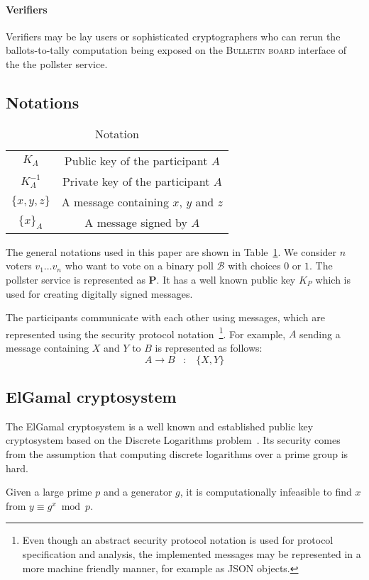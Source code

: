 \paragraph{Verifiers}
Verifiers may be lay users or sophisticated cryptographers who can
rerun the ballots-to-tally computation being exposed on the
\textsc{Bulletin board} interface of the the pollster service.


\subsection{Notations}

\begin{table}[t]
\caption{Notation}
\begin{center}
\begin{tabular}{|cc|} \hline
$K_A$   &  Public key of the participant $A$\\
$K^{-1}_A$   &  Private key of the participant $A$ \\
$\{x,y,z\}$   &  A message containing $x$, $y$ and $z$ \\
$\{x\}_A$ &  A message signed by $A$ \\ \hline
\end{tabular}
\label{table:notation}
\end{center}
\end{table}
  
The general notations used in this paper are shown in Table~\ref{table:notation}.
We consider $n$ voters $v_1\ldots v_n$  who want to vote on a
binary poll $\mathcal{B}$ with choices $0$ or $1$.
The pollster service is represented as $\mathbf{P}$.
It has a well known public key $K_P$ which
is used for creating digitally signed messages.

The participants communicate with each other using messages, which are
represented using the security protocol
notation~\footnote{ Even though an abstract
  security protocol notation is used for protocol
  specification and analysis, the implemented messages may be represented
  in a more machine friendly manner, for example as JSON objects.
}.
For example, $A$ sending a message containing
$X$ and $Y$ to $B$ is represented as follows:
\[
A \rightarrow B \hspace{10pt} : \hspace{10pt} \{X,Y\}  
\]

\subsection{ElGamal cryptosystem}
The ElGamal cryptosystem is a well known
and established public key
cryptosystem based on the Discrete Logarithms problem~\cite{1057074}.
Its security
comes from the assumption that computing discrete logarithms over
a prime group is hard.
\begin{assumption}
Given a large prime $p$ and a generator $g$,
it is computationally infeasible to find $x$ from $y \equiv g^x \bmod p$.
\end{assumption}


